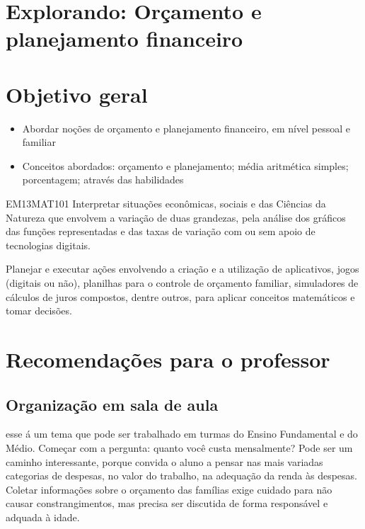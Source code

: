 \begin{paginatexto}
\section*{Explorando: Orçamento e planejamento financeiro}

\section*{Objetivo geral}

\begin{itemize}
\item Abordar noções de orçamento e planejamento financeiro, em nível pessoal e familiar

\item Conceitos abordados: orçamento e planejamento; média aritmética simples; porcentagem; através das habilidades
\end{itemize}

\begin{habilities}{EM13MAT101}
 Interpretar situações econômicas, sociais e das Ciências da Natureza
que envolvem a variação de duas grandezas, pela análise dos gráficos das funções representadas e das taxas de variação com ou sem apoio de tecnologias digitais.

Planejar e executar ações envolvendo a criação e a utilização de aplicativos, jogos (digitais ou não), planilhas para o controle de orçamento familiar, simuladores de cálculos de juros compostos, dentre outros, para aplicar conceitos matemáticos e tomar decisões. 

\end{habilities}

\section*{Recomendações para o professor}

\subsection{Organização em sala de aula} esse á um tema que pode ser trabalhado em turmas do Ensino Fundamental e do Médio. Começar com a pergunta: quanto você custa mensalmente? Pode ser um caminho interessante, porque convida o aluno a pensar nas mais variadas categorias de despesas, no valor do trabalho, na adequação da renda às despesas. Coletar informações sobre o orçamento das famílias exige cuidado para não causar constrangimentos, mas precisa ser discutida de forma responsável e adquada à idade.


\end{paginatexto}
